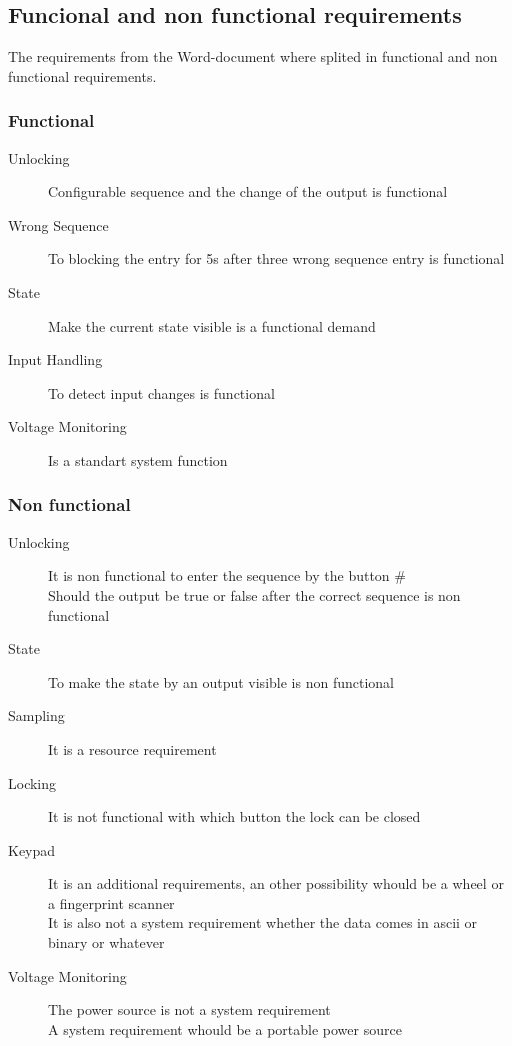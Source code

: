 	
	\subsection{Funcional and non functional requirements}\label{subsec:func}
	The requirements from the Word-document where splited in functional and non functional requirements.
		\subsubsection{Functional}
			\begin{description}
				\item [Unlocking] Configurable sequence and the change of the output is functional\\
				\item [Wrong Sequence] To blocking the entry for 5s after three wrong sequence entry is functional
				\item [State] Make the current state visible is a functional demand
				\item [Input Handling] To detect input changes is functional															
				\item [Voltage Monitoring] Is a standart system function
			\end{description}
		\subsubsection{Non functional}
			\begin{description}
				\item [Unlocking] It is non functional to enter the sequence by the button \# \\
				Should the output be true or false after the correct sequence is non functional
				\item [State] To make the state by an output visible is non functional
				\item [Sampling] It is a resource requirement
				\item [Locking] It is not functional with which button the lock can be closed
				\item [Keypad] It is an additional requirements, an other possibility whould be a wheel or a fingerprint scanner\\
				It is also not a system requirement whether the data comes in ascii or binary or whatever
				\item [Voltage Monitoring] The power source is not a system requirement\\
				A system requirement whould be a portable power source		
			\end{description}

